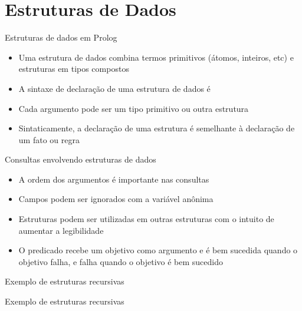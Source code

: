 \section{Estruturas de Dados}

\begin{frame}[fragile]{Estruturas de dados em Prolog}

    \begin{itemize}
        \item Uma estrutura de dados combina termos primitivos (átomos, inteiros, etc) e 
            estruturas em tipos compostos

        \item A sintaxe de declaração de uma estrutura de dados é 


        \item Cada argumento pode ser um tipo primitivo ou outra estrutura

        \item Sintaticamente, a declaração de uma estrutura é semelhante à declaração de um 
            fato ou regra


   \end{itemize}

\end{frame}

\begin{frame}[fragile]{Consultas envolvendo estruturas de dados}

    \begin{itemize}
        \item A ordem dos argumentos é importante nas consultas


        \item Campos podem ser ignorados com a variável anônima

        \item Estruturas podem ser utilizadas em outras estruturas com o intuito de aumentar a 
            legibilidade


        \item O predicado  recebe um objetivo como argumento e é bem 
            sucedida quando o objetivo falha, e falha quando o objetivo é bem sucedido

    \end{itemize}

\end{frame}

\begin{frame}[fragile]{Exemplo de estruturas recursivas}


\end{frame}

\begin{frame}[fragile]{Exemplo de estruturas recursivas}


\end{frame}
